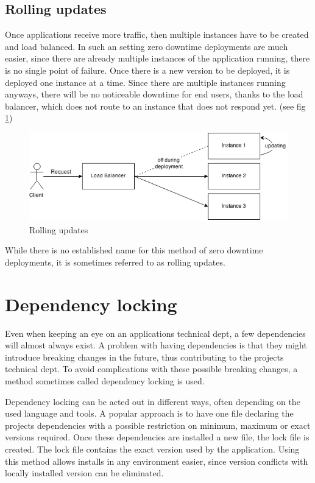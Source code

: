 \subsection{Rolling updates}

Once applications receive more traffic, then multiple instances have to be
created and load balanced. In such an setting zero downtime deployments are
much easier, since there are already multiple instances of the application
running, there is no single point of failure. Once there is a new version to be
deployed, it is deployed one instance at a time. Since there are multiple
instances running anyways, there will be no noticeable downtime for end users,
thanks to the load balancer, which does not route to an instance that does not
respond yet. (see fig \ref{fig:rolling_updates})

\begin{figure}
  \includegraphics[scale=0.55]{pictures/rolling_updates.png}
  \caption{Rolling updates}
  \centering
  \label{fig:rolling_updates}
\end{figure}

While there is no established name for this method of zero downtime
deployments, it is sometimes referred to as rolling updates.

\section{Dependency locking}

Even when keeping an eye on an applications technical dept, a few dependencies
will almost always exist. A problem with having dependencies is that they might
introduce breaking changes in the future, thus contributing to the projects
technical dept. To avoid complications with these possible breaking changes, a
method sometimes called dependency locking is used.

Dependency locking can be acted out in different ways, often depending on the
used language and tools. A popular approach is to have one file declaring the
projects dependencies with a possible restriction on minimum, maximum or exact
versions required. Once these dependencies are installed a new file, the lock
file is created. The lock file contains the exact version used by the
application. Using this method allows installs in any environment easier, since
version conflicts with locally installed version can be eliminated.

